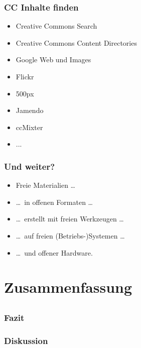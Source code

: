 \documentclass{beamer}
\begin{document}
\begin{frame}
    \frametitle{CC Inhalte finden}
    \begin{itemize}
        \item<2-> Creative Commons Search
        \item<3-> Creative Commons Content Directories
        \item<4-> Google Web und Images
        \item<5-> Flickr
        \item<6-> 500px
        \item<7-> Jamendo
        \item<8-> ccMixter
        \item<9-> ...
    \end{itemize}
\end{frame}

\begin{frame}
    \frametitle{Und weiter?}
    \begin{itemize}
      \item<2-> Freie Materialien \dots
      \item<3-> \dots~in offenen Formaten \dots
      \item<4-> \dots~erstellt mit freien Werkzeugen \dots
      \item<5-> \dots~auf freien (Betriebs-)Systemen \dots
      \item<6-> \dots~und offener Hardware.
    \end{itemize}
\end{frame}

\section{Zusammenfassung}
\subsection{}

\begin{frame}
    \frametitle{Fazit}
    \begin{itemize}
    \end{itemize}
\end{frame}

\begin{frame}
    \frametitle{Diskussion}
\end{frame}
\end{document}

